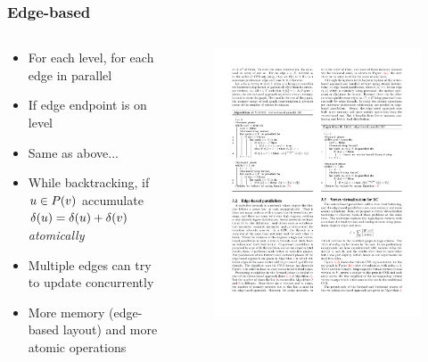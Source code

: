 \begin{frame}
  \frametitle{Edge-based}

  \begin{columns}[onlytextwidth]
    \begin{column}{0.5\textwidth}
      \begin{itemize}
        \item For each level, for each edge in parallel
        \item If edge endpoint is on level
        \item Same as above...
        \item While backtracking, if $u \in P(v)$ accumulate $\delta(u) = \delta(u) + \delta(v)$ \emph{atomically}
        \item Multiple edges can try to update \dep concurrently
        \item More memory (edge-based layout) and more atomic operations
      \end{itemize}
    \end{column}

    \begin{column}{0.5\textwidth}
      \begin{figure}[t]
        \centering
        \includegraphics[width=\textwidth, height=0.8\textheight, keepaspectratio]{imgs/gpu-algo-edge}
      \end{figure}
    \end{column}
  \end{columns}

\end{frame}


